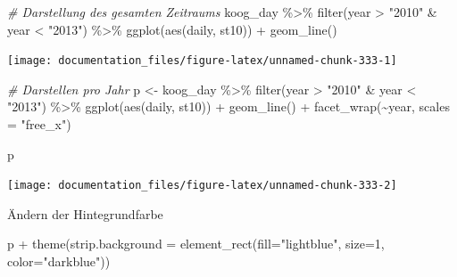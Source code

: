 \documentclass[
]{article}
\newenvironment{Shaded}{\begin{snugshade}}{\end{snugshade}}
\newcommand{\AttributeTok}[1]{\textcolor[rgb]{0.77,0.63,0.00}{#1}}
\newcommand{\CommentTok}[1]{\textcolor[rgb]{0.56,0.35,0.01}{\textit{#1}}}
\newcommand{\DecValTok}[1]{\textcolor[rgb]{0.00,0.00,0.81}{#1}}
\newcommand{\FunctionTok}[1]{\textcolor[rgb]{0.00,0.00,0.00}{#1}}
\newcommand{\NormalTok}[1]{#1}
\newcommand{\OtherTok}[1]{\textcolor[rgb]{0.56,0.35,0.01}{#1}}
\newcommand{\SpecialCharTok}[1]{\textcolor[rgb]{0.00,0.00,0.00}{#1}}
\newcommand{\StringTok}[1]{\textcolor[rgb]{0.31,0.60,0.02}{#1}}
\begin{document}
\begin{Shaded}
\begin{Highlighting}[]
\CommentTok{\# Darstellung des gesamten Zeitraums}
\NormalTok{koog\_day }\SpecialCharTok{\%\textgreater{}\%}
  \FunctionTok{filter}\NormalTok{(year }\SpecialCharTok{\textgreater{}} \StringTok{"2010"} \SpecialCharTok{\&}\NormalTok{ year }\SpecialCharTok{\textless{}} \StringTok{"2013"}\NormalTok{) }\SpecialCharTok{\%\textgreater{}\%}
  \FunctionTok{ggplot}\NormalTok{(}\FunctionTok{aes}\NormalTok{(daily, st10)) }\SpecialCharTok{+}
  \FunctionTok{geom\_line}\NormalTok{()}
\end{Highlighting}
\end{Shaded}

\begin{center}\texttt{[image: documentation\_files/figure-latex/unnamed-chunk-333-1]} \end{center}

\begin{Shaded}
\begin{Highlighting}[]

\CommentTok{\# Darstellen pro Jahr}
\NormalTok{p }\OtherTok{\textless{}{-}}\NormalTok{ koog\_day }\SpecialCharTok{\%\textgreater{}\%}
  \FunctionTok{filter}\NormalTok{(year }\SpecialCharTok{\textgreater{}} \StringTok{"2010"} \SpecialCharTok{\&}\NormalTok{ year }\SpecialCharTok{\textless{}} \StringTok{"2013"}\NormalTok{) }\SpecialCharTok{\%\textgreater{}\%}
  \FunctionTok{ggplot}\NormalTok{(}\FunctionTok{aes}\NormalTok{(daily, st10)) }\SpecialCharTok{+}
  \FunctionTok{geom\_line}\NormalTok{() }\SpecialCharTok{+}
  \FunctionTok{facet\_wrap}\NormalTok{(}\SpecialCharTok{\textasciitilde{}}\NormalTok{year, }\AttributeTok{scales =} \StringTok{"free\_x"}\NormalTok{)}

\NormalTok{p}
\end{Highlighting}
\end{Shaded}

\begin{center}\texttt{[image: documentation\_files/figure-latex/unnamed-chunk-333-2]} \end{center}

Ändern der Hintegrundfarbe

\begin{Shaded}
\begin{Highlighting}[]
\NormalTok{p }\SpecialCharTok{+} \FunctionTok{theme}\NormalTok{(}\AttributeTok{strip.background =} \FunctionTok{element\_rect}\NormalTok{(}\AttributeTok{fill=}\StringTok{"lightblue"}\NormalTok{, }\AttributeTok{size=}\DecValTok{1}\NormalTok{, }\AttributeTok{color=}\StringTok{"darkblue"}\NormalTok{))}
\end{Highlighting}
\end{Shaded}
\end{document}
